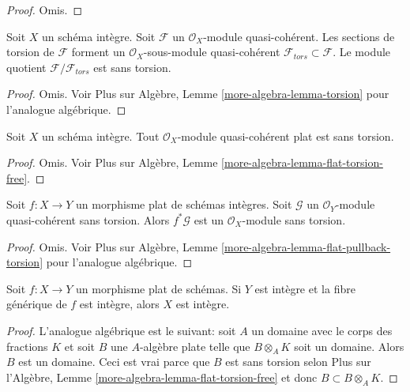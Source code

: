 \begin{proof}
Omis.
\end{proof}

\begin{lemma}
\label{lemma-torsion}
Soit  $X$  un schéma intègre. Soit  $\mathcal{F}$  un  $\mathcal{O}_X$-module
quasi-cohérent. Les sections de torsion de  $\mathcal{F}$  forment un
 $\mathcal{O}_X$-sous-module quasi-cohérent  $\mathcal{F}_{tors} \subset \mathcal{F}$. Le module quotient
 $\mathcal{F}/\mathcal{F}_{tors}$  est sans torsion.
\end{lemma}

\begin{proof}
Omis. Voir Plus sur Algèbre, Lemme  \ref{more-algebra-lemma-torsion}  pour l'analogue algébrique.
\end{proof}

\begin{lemma}
\label{lemma-flat-torsion-free}
Soit  $X$  un schéma intègre. Tout  $\mathcal{O}_X$-module quasi-cohérent plat
est sans torsion.
\end{lemma}

\begin{proof}
Omis. Voir Plus sur Algèbre, Lemme  \ref{more-algebra-lemma-flat-torsion-free}.
\end{proof}

\begin{lemma}
\label{lemma-flat-pullback-torsion}
Soit  $f : X \to Y$  un morphisme plat de schémas intègres. Soit  $\mathcal{G}$  un
 $\mathcal{O}_Y$-module quasi-cohérent sans torsion. Alors  $f^*\mathcal{G}$  est un
 $\mathcal{O}_X$-module sans torsion.
\end{lemma}

\begin{proof}
Omis. Voir Plus sur Algèbre, Lemme  \ref{more-algebra-lemma-flat-pullback-torsion}  pour l'analogue algébrique.
\end{proof}

\begin{lemma}
\label{lemma-flat-over-integral-integral-fibre}
Soit  $f : X \to Y$  un morphisme plat de schémas. Si  $Y$  est intègre et la
fibre générique de  $f$  est intègre, alors  $X$  est intègre.
\end{lemma}

\begin{proof}
L'analogue algébrique est le suivant: soit  $A$  un domaine avec le corps
des fractions  $K$  et soit  $B$  une  $A$-algèbre plate
telle que  $B \otimes_A K$  soit un domaine. Alors  $B$  est un domaine. Ceci
est vrai parce que  $B$  est sans torsion selon Plus sur l’Algèbre, Lemme
 \ref{more-algebra-lemma-flat-torsion-free}  et donc  $B \subset B \otimes_A K$.
\end{proof}


